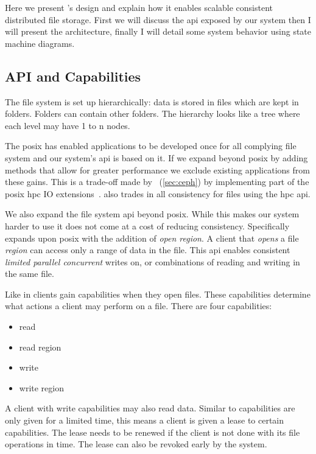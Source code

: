 Here we present \name{}'s design and explain how it enables scalable consistent distributed file storage. First we will discuss the \ac{api} exposed by our system then I will present the architecture, finally I will detail some system behavior using state machine diagrams. 
%
\subsection{API and Capabilities}
The file system is set up hierarchically: data is stored in files which are kept in folders. Folders can contain other folders. The hierarchy looks like a tree where each level may have 1 to n nodes.

The \ac{posix} has enabled applications to be developed once for all complying file system and our system's \ac{api} is based on it. If we expand beyond \ac{posix} by adding methods that allow for greater performance we exclude existing applications from these gains. This is a trade-off made by \ceph{}~(\cref{sec:ceph}) by implementing part of the \ac{posix} \ac{hpc} IO extensions~\cite{hpc_posix}. \ceph{} also trades in all consistency for files using the \ac{hpc} \ac{api}. 

We also expand the file system \ac{api} beyond \ac{posix}. While this makes our system harder to use it does not come at a cost of reducing consistency. Specifically \name{} expands upon \ac{posix} with the addition of \textsl{open region}. A client that \textit{opens} a file \textit{region} can access only a range of data in the file. This \ac{api} enables consistent \emph{limited parallel concurrent} writes on, or combinations of reading and writing in the same file.

Like \ceph{} in \name{} clients gain capabilities when they open files. These capabilities determine what actions a client may perform on a file. There are four capabilities: \nopagebreak
%
\begin{multicols}{4} %
\begin{itemize}
	\item read
	\item read region
	\item write
	\item write region
\end{itemize}
\end{multicols}
%
A client with write capabilities may also read data. Similar to \ceph{} capabilities are only given for a limited time, this means a client is given a lease to certain capabilities. The lease needs to be renewed if the client is not done with its file operations in time. The lease can also be revoked early by the system.

